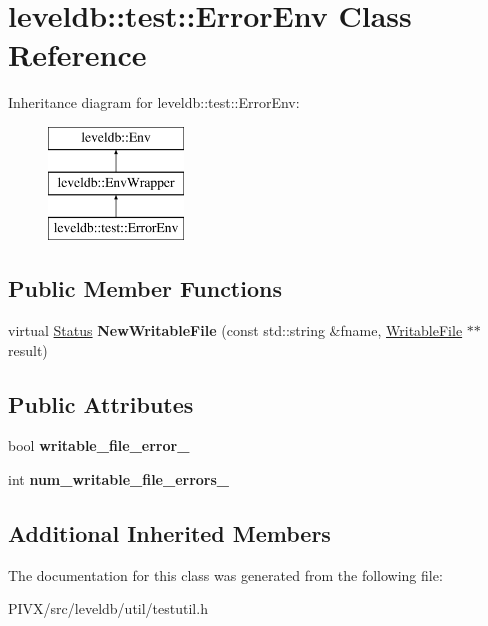 \hypertarget{classleveldb_1_1test_1_1_error_env}{}\section{leveldb\+:\+:test\+:\+:Error\+Env Class Reference}
\label{classleveldb_1_1test_1_1_error_env}
Inheritance diagram for leveldb\+:\+:test\+:\+:Error\+Env\+:\begin{figure}[H]
\begin{center}
\leavevmode
\includegraphics[height=3.000000cm]{classleveldb_1_1test_1_1_error_env}
\end{center}
\end{figure}
\subsection*{Public Member Functions}
\begin{DoxyCompactItemize}
\item 
\mbox{\label{classleveldb_1_1test_1_1_error_env_a2990be71c7fb9473bd1fa0f8da8fd078}} 
virtual \mbox{\hyperlink{classleveldb_1_1_status}{Status}} {\bfseries New\+Writable\+File} (const std\+::string \&fname, \mbox{\hyperlink{classleveldb_1_1_writable_file}{Writable\+File}} $\ast$$\ast$result)
\end{DoxyCompactItemize}
\subsection*{Public Attributes}
\begin{DoxyCompactItemize}
\item 
\mbox{\label{classleveldb_1_1test_1_1_error_env_ae3593b752dff671f24f3637376e1cf22}} 
bool {\bfseries writable\+\_\+file\+\_\+error\+\_\+}
\item 
\mbox{\label{classleveldb_1_1test_1_1_error_env_afa4564355d86107c8ed0d6efe53eadef}} 
int {\bfseries num\+\_\+writable\+\_\+file\+\_\+errors\+\_\+}
\end{DoxyCompactItemize}
\subsection*{Additional Inherited Members}


The documentation for this class was generated from the following file\+:\begin{DoxyCompactItemize}
\item 
P\+I\+V\+X/src/leveldb/util/testutil.\+h\end{DoxyCompactItemize}
